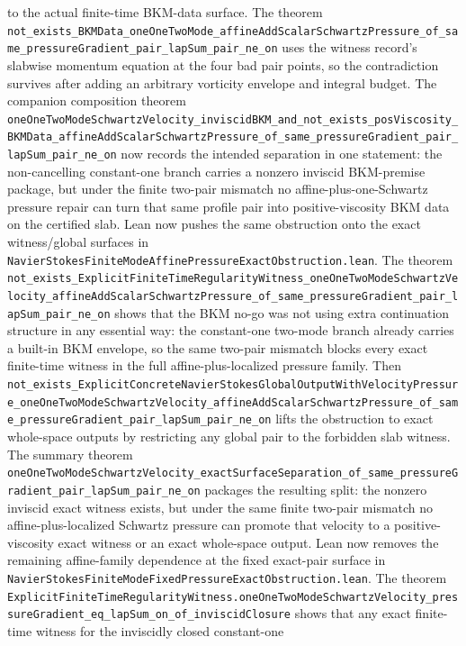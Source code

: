 \documentclass[11pt]{article}
\theoremstyle{remark}
\begin{document}
to the actual finite-time BKM-data surface.  The theorem
\texttt{not\_exists\_BKMData\_oneOneTwoMode\_affineAddScalarSchwartzPressure\_of\_same\_pressureGradient\_pair\_lapSum\_pair\_ne\_on}
uses the witness record's slabwise momentum equation at the four bad pair
points, so the contradiction survives after adding an arbitrary vorticity
envelope and integral budget.  The companion composition theorem
\texttt{oneOneTwoModeSchwartzVelocity\_inviscidBKM\_and\_not\_exists\_posViscosity\_BKMData\_affineAddScalarSchwartzPressure\_of\_same\_pressureGradient\_pair\_lapSum\_pair\_ne\_on}
now records the intended separation in one statement: the non-cancelling
constant-one branch carries a nonzero inviscid BKM-premise package, but under
the finite two-pair mismatch no affine-plus-one-Schwartz pressure repair can
turn that same profile pair into positive-viscosity BKM data on the certified
slab.
Lean now pushes the same obstruction onto the exact witness/global surfaces in
\texttt{NavierStokesFiniteModeAffinePressureExactObstruction.lean}.  The theorem
\texttt{not\_exists\_ExplicitFiniteTimeRegularityWitness\_oneOneTwoModeSchwartzVelocity\_affineAddScalarSchwartzPressure\_of\_same\_pressureGradient\_pair\_lapSum\_pair\_ne\_on}
shows that the BKM no-go was not using extra continuation structure in any
essential way: the constant-one two-mode branch already carries a built-in BKM
envelope, so the same two-pair mismatch blocks every exact finite-time witness
in the full affine-plus-localized pressure family.  Then
\texttt{not\_exists\_ExplicitConcreteNavierStokesGlobalOutputWithVelocityPressure\_oneOneTwoModeSchwartzVelocity\_affineAddScalarSchwartzPressure\_of\_same\_pressureGradient\_pair\_lapSum\_pair\_ne\_on}
lifts the obstruction to exact whole-space outputs by restricting any global
pair to the forbidden slab witness.  The summary theorem
\texttt{oneOneTwoModeSchwartzVelocity\_exactSurfaceSeparation\_of\_same\_pressureGradient\_pair\_lapSum\_pair\_ne\_on}
packages the resulting split: the nonzero inviscid exact witness exists, but
under the same finite two-pair mismatch no affine-plus-localized Schwartz
pressure can promote that velocity to a positive-viscosity exact witness or an
exact whole-space output.
Lean now removes the remaining affine-family dependence at the fixed exact-pair
surface in
\texttt{NavierStokesFiniteModeFixedPressureExactObstruction.lean}.  The theorem
\texttt{ExplicitFiniteTimeRegularityWitness.oneOneTwoModeSchwartzVelocity\_pressureGradient\_eq\_lapSum\_on\_of\_inviscidClosure}
shows that any exact finite-time witness for the inviscidly closed constant-one
\end{document}
